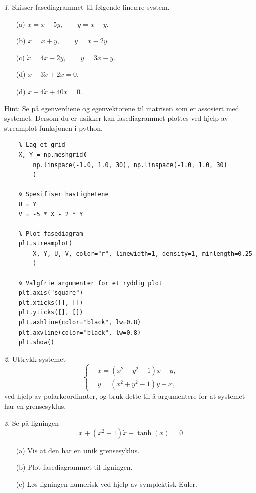 \documentclass{article}
\theoremstyle{plain}
\theoremstyle{definition}
\theoremstyle{remark}
\newtheorem{oppg}{}
\begin{document}
\begin{oppg}
    Skisser fasediagrammet til følgende lineære system.
    \begin{itemize}
        \item[(a)] $\dot{x} = x - 5y, \qquad \dot{y} = x - y$.
        \item[(b)] $\dot{x} = x + y, \qquad \dot{y} = x - 2y$.
        \item[(c)] $\dot{x} = 4x - 2y, \qquad \dot{y} = 3x - y$.
        \item[(d)] $\ddot{x} + 3\dot{x} + 2x = 0$.
        \item[(d)] $\ddot{x} - 4\dot{x} + 40x = 0$.
    \end{itemize}
    Hint: Se på egenverdiene og egenvektorene til matrisen som er assosiert med systemet. Dersom du er usikker kan fasediagrammet plottes ved hjelp av streamplot-funksjonen i python.
    \begin{lstlisting}
    % Lag et grid
    X, Y = np.meshgrid(
        np.linspace(-1.0, 1.0, 30), np.linspace(-1.0, 1.0, 30)
        )
    
    % Spesifiser hastighetene
    U = Y
    V = -5 * X - 2 * Y

    % Plot fasediagram
    plt.streamplot(
        X, Y, U, V, color="r", linewidth=1, density=1, minlength=0.25
        )
    
    % Valgfrie argumenter for et ryddig plot
    plt.axis("square")
    plt.xticks([], [])
    plt.yticks([], [])
    plt.axhline(color="black", lw=0.8)
    plt.axvline(color="black", lw=0.8)
    plt.show()

    \end{lstlisting}
\end{oppg}

\begin{oppg}
    Uttrykk systemet
    \begin{equation*}
        \left\{
            \begin{aligned}
                & \dot{x} = (x^2 + y^2 - 1)x + y, \\
                & \dot{y} = (x^2 + y^2 - 1)y - x,
            \end{aligned}    
        \right.
    \end{equation*}
    ved hjelp av polarkoordinater, og bruk dette til å argumentere for at systemet har en grensesyklus.
\end{oppg}

\begin{oppg}
    Se på ligningen
    \begin{equation*}
        \ddot{x} + (x^2 - 1) \dot{x} + \tanh(x) = 0
    \end{equation*}
    \begin{itemize}
        \item[(a)] Vis at den har en unik grensesyklus.
        \item[(b)] Plot fasediagrammet til ligningen.
        \item[(c)] Løs ligningen numerisk ved hjelp av symplektisk Euler.
    \end{itemize}
\end{oppg}
\end{document}
